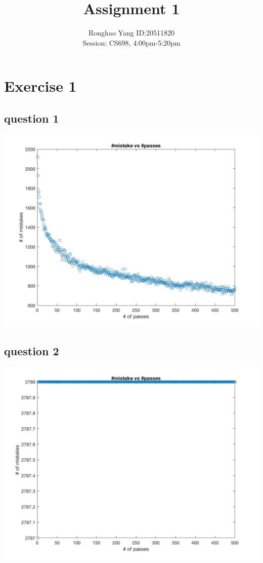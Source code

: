 \documentclass[11pt]{article} %
\title{Assignment 1}
\author{Ronghao Yang ID:20511820\\Session: CS698, 4:00pm-5:20pm}
\begin{document}
\maketitle

\section{Exercise 1}

\subsection{question 1}
\includegraphics[scale=0.4]{e1q1.jpg}
\subsection{question 2}
\includegraphics[scale=0.4]{e1q2.jpg}
\end{document}
